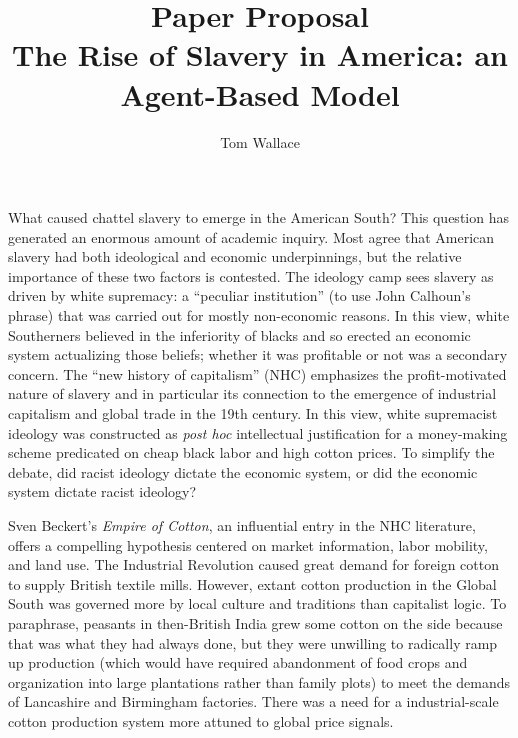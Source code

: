 \documentclass{article}
\author{Tom Wallace}
\title{Paper Proposal 
\\ \large The Rise of Slavery in America: an Agent-Based Model}
\begin{document}
\maketitle

What caused chattel slavery to emerge in the American South? This question has generated an enormous amount of
academic inquiry. Most agree that American slavery had both ideological and
economic underpinnings, but the relative importance of these two factors is
contested. The ideology camp sees slavery as driven by white supremacy: a 
``peculiar institution'' (to use John Calhoun's phrase) 
that was carried out for mostly non-economic reasons. In this view,
white Southerners believed in the inferiority of blacks and so erected an economic
system actualizing those beliefs; whether it was profitable or not was a
secondary concern. The ``new history of capitalism'' (NHC) 
emphasizes the profit-motivated nature of slavery and 
in particular its connection to the emergence of industrial capitalism
and global trade in the 19th century. In this view, white supremacist ideology was constructed as 
\textit{post hoc} intellectual justification for a money-making scheme predicated
on cheap black labor and high cotton prices. 
To simplify the debate, did racist ideology
dictate the economic system, or did the economic system dictate racist 
ideology?

Sven Beckert's \textit{Empire of Cotton}, an influential entry in the
NHC literature, offers a compelling hypothesis centered on market information,
labor mobility, and land use. The Industrial Revolution caused great demand
for foreign cotton to supply British textile mills. However, extant cotton production
in the Global South was governed more by local culture and traditions than
capitalist logic. To paraphrase, peasants in then-British India 
grew some cotton on the side because that was what they had always done, 
but they were unwilling to radically ramp up production (which would have
required abandonment of food crops and organization into large plantations rather 
than family plots) to meet the demands of Lancashire and Birmingham factories. 
There was a need for a industrial-scale cotton production system more attuned to 
global price signals. 
\end{document}
